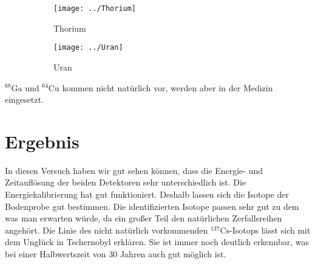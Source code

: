 \documentclass[11pt, ngerman, fleqn, DIV=15, headinclude, BCOR=2cm]{scrreprt}
\begin{document}
\begin{figure}
    \centering
    \begin{subfigure}[b]{0.48\linewidth}
    \centering
    \texttt{[image: ../Thorium]}
    \caption{%
        Thorium
        \parencite{thorium}
    }
    \label{fig:}
    \end{subfigure}
    \hfill
    \begin{subfigure}[b]{0.48\linewidth}
    \centering
    \texttt{[image: ../Uran]}
    \caption{%
        Uran
        \parencite{uran}
    }
    \label{fig:}
    \end{subfigure}
    \caption{%
    }
    \label{fig:}
\end{figure}

$^{68}\text{Ga}$ und $^{64}\text{Cu}$ kommen nicht natürlich vor, werden aber
in der Medizin eingesetzt.



\chapter{Ergebnis}

In diesen Versuch haben wir gut sehen können, dass die Energie- und Zeitauflösung der
beiden Detektoren sehr unterschiedlich ist. Die Energiekalibrierung hat gut funktioniert. 
Deshalb lassen sich die Isotope der Bodenprobe gut bestimmen. Die identifizierten Isotope 
passen sehr gut zu dem was man erwarten würde, da ein großer Teil den
natürlichen Zerfallsreihen angehört. Die Linie des
nicht natürlich vorkommenden $^{137}\text{Cs}$-Isotops lässt sich mit dem
Unglück in Tschernobyl erklären. Sie ist immer noch deutlich erkennbar, was bei
einer Halbwertszeit von 30 Jahren auch gut möglich ist.

\end{document}
